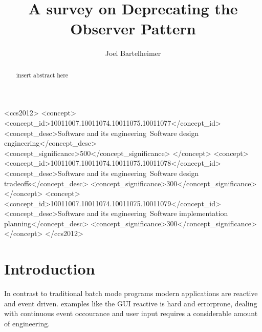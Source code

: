 \documentclass[format=acmtog]{acmart}
\begin{document}
	\title{A survey on Deprecating the Observer Pattern}
	
	\author{Joel Bartelheimer}


\renewcommand\shortauthors{Bartelheimer, J. }

\begin{abstract}
	insert abstract here
\end{abstract}


%
%
\begin{CCSXML}
	<ccs2012>
	<concept>
	<concept_id>10011007.10011074.10011075.10011077</concept_id>
	<concept_desc>Software and its engineering~Software design engineering</concept_desc>
	<concept_significance>500</concept_significance>
	</concept>
	<concept>
	<concept_id>10011007.10011074.10011075.10011078</concept_id>
	<concept_desc>Software and its engineering~Software design tradeoffs</concept_desc>
	<concept_significance>300</concept_significance>
	</concept>
	<concept>
	<concept_id>10011007.10011074.10011075.10011079</concept_id>
	<concept_desc>Software and its engineering~Software implementation planning</concept_desc>
	<concept_significance>300</concept_significance>
	</concept>
	</ccs2012>
\end{CCSXML}

%
%
\maketitle


\section{Introduction}

	In contrast to traditional batch mode programs modern applications are reactive and event driven. 
	examples like the GUI 
	reactive is hard and errorprone, dealing with continuous event occourance and user input requires a considerable amount of engineering.
	
\end{document}
